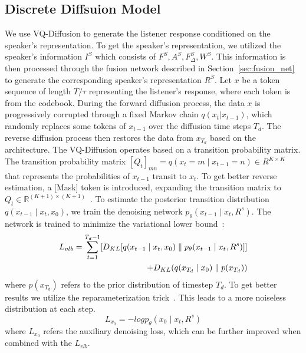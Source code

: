 \subsection{Discrete Diffsuion Model}
We use VQ-Diffusion\cite{gu2022vector} to generate the listener response conditioned on the speaker's representation.
To get the speaker's representation, we utilized the speaker's information $I^S$ which consists of $F^{S}, A^{S}, F_\Delta^{S}, W^{S}$.
This information is then processed through the fusion network described in Section~\ref{sec:fusion_net} to generate the corresponding speaker's representation $R^S$. 
Let $\mathit{x}$ be a token sequence of length $T/\tau$ representing the listener's response, where each token is from the codebook.
During the forward diffusion process, the data $\mathit{x}$ is progressively corrupted through a fixed Markov chain $q(x_t|x_{t-1})$, which randomly replaces some tokens of $\mathit{x_{t-1}}$ over the diffusion time steps $T_d$. The reverse diffusion process then restores the data from $\mathit{x_{T_d}}$ based on the architecture.
The VQ-Diffusion\cite{gu2022vector} operates based on a transition probability matrix. 
The transition probability matrix $[Q_t]_{mn} = q(x_t=m \mid x_{t-1} = n) \in R^{K \times K}$ that represents the probabilities of $x_{t-1}$ transit to $x_t$.
To get better reverse estimation, a [Mask] token is introduced, expanding the transition matrix to $Q_t \in \mathbb{R}^{(K+1) \times (K+1)}$~\cite{gu2022vector}. 
To estimate the posterior transition distribution $q(x_{t-1} \mid x_t,x_0)$, we train the denoising network $p_\theta(x_{t-1}\mid x_t,R^s)$.
The network is trained to minimize the variational lower bound~\cite{sohl2015deep}:
\begin{align}
    L_{vlb} = \sum_{t=1}^{T_d-1}[D_{KL}[q(x_{t-1} \mid x_t,x_0) \parallel p_\theta(x_{t-1} \mid x_t, R^s)]] \notag \\
    +D_{KL}(q(x_{T_d}\mid x_0) \parallel p(x_{T_d}))
\end{align}
where $p(x_{T_d})$ refers to the prior distribution of timestep $T_d$. To get better results we utilize the reparameterization trick~\cite{gu2022vector}. 
This leads to a more noiseless distribution at each step. 
\begin{equation}
    L_{x_0} = -logp_\theta(x_0\mid x_t,R^s)
\end{equation}
where $L_{x_0}$ refers the auxiliary denoising loss, which can be further improved when combined with the $L_{vlb}$.


